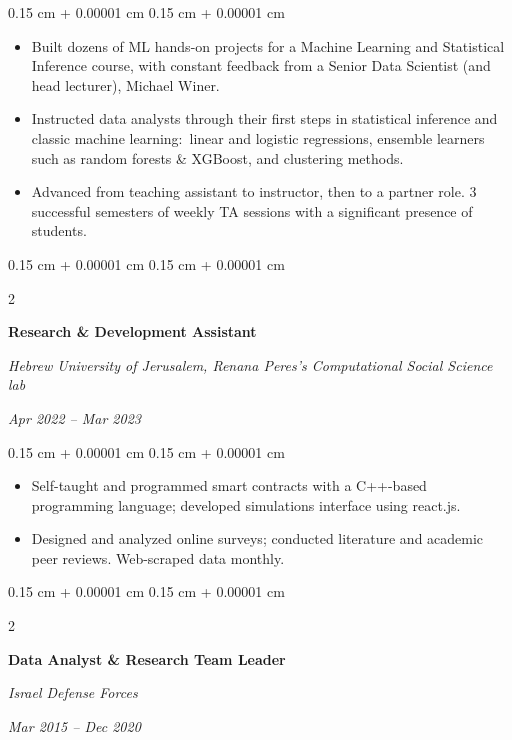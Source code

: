 \documentclass[10pt, letterpaper]{article}
\newenvironment{highlights}{
    \begin{itemize}[
        topsep=0.08 cm,
        parsep=0.08 cm,
        partopsep=0pt,
        itemsep=0pt,
        leftmargin=0.25 cm + 10pt
    ]
}{
    \end{itemize}
} %
\newenvironment{onecolentry}{
    \begin{adjustwidth}{
        0.15 cm + 0.00001 cm
    }{
        0.15 cm + 0.00001 cm
    }
}{
    \end{adjustwidth}
} %
\newenvironment{twocolentry}[2][]{
    \onecolentry
    \def\secondColumn{#2}
    \setcolumnwidth{\fill, 4 cm}
    \begin{paracol}{2}
}{
    \switchcolumn \raggedleft \secondColumn
    \end{paracol}
    \endonecolentry
} %
\begin{document}
        \vspace{0.08 cm}
        \begin{onecolentry}
            \begin{highlights}
                \item Built dozens of ML hands-on projects for a Machine Learning and Statistical Inference course, with constant feedback from a Senior Data Scientist (and head lecturer), Michael Winer.
                \item Instructed data analysts through their first steps in statistical inference and classic machine learning$:$ linear and logistic regressions, ensemble learners such as random forests \& XGBoost, and clustering methods.
                \item Advanced from teaching assistant to instructor, then to a partner role. 3 successful semesters of weekly TA sessions with a significant presence of students.
            \end{highlights}
        \end{onecolentry}


        \vspace{0.15 cm}

        \begin{twocolentry}{
            
            
        \textit{Apr 2022 – Mar 2023}}
            \textbf{Research \& Development Assistant}
            
            \textit{Hebrew University of Jerusalem, Renana Peres's Computational Social Science lab}
        \end{twocolentry}

        \vspace{0.08 cm}
        \begin{onecolentry}
            \begin{highlights}
                \item Self-taught and programmed smart contracts with a C++-based programming language; developed simulations interface using react.js.
                \item Designed and analyzed online surveys; conducted literature and academic peer reviews. Web-scraped data monthly.
            \end{highlights}
        \end{onecolentry}


        \vspace{0.15 cm}

        \begin{twocolentry}{
            
            
        \textit{Mar 2015 – Dec 2020}}
            \textbf{Data Analyst \& Research Team Leader}
            
            \textit{Israel Defense Forces}
        \end{twocolentry}
\end{document}

